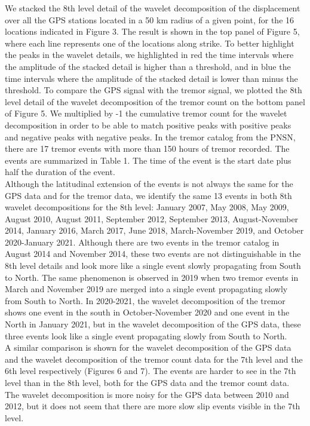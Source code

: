 \documentclass{article}
\begin{document}
We stacked the 8th level detail of the wavelet decomposition of the displacement over all the GPS stations located in a 50 km radius of a given point, for the 16 locations indicated in Figure 3. The result is shown in the top panel of Figure 5, where each line represents one of the locations along strike. To better highlight the peaks in the wavelet details, we highlighted in red the time intervals where the amplitude of the stacked detail is higher than a threshold, and in blue the  time intervals where the amplitude of the stacked detail is lower than minus the threshold. To compare the GPS signal with the tremor signal, we plotted the 8th level detail of the wavelet decomposition of the tremor count on the bottom panel of Figure 5. We multiplied by -1 the cumulative tremor count for the wavelet decomposition in order to be able to match positive peaks with positive peaks and negative peaks with negative peaks. In the tremor catalog from the PNSN, there are 17 tremor events with more than 150 hours of tremor recorded. The events are summarized in Table 1. The time of the event is the start date plus half the duration of the event. \\

Although the latitudinal extension of the events is not always the same for the GPS data and for the tremor data, we identify the same 13 events in both 8th wavelet decompositions for the 8th level: January 2007, May 2008, May 2009, August 2010, August 2011, September 2012, September 2013, August-November 2014, January 2016, March 2017, June 2018, March-November 2019, and October 2020-January 2021. Although there are two events in the tremor catalog in August 2014 and November 2014, these two events are not distinguishable in the 8th level details and look more like a single event slowly propagating from South to North. The same phenomenon is observed in 2019 when two tremor events in March and November 2019 are merged into a single event propagating slowly from South to North. In 2020-2021, the wavelet decomposition of the tremor shows one event in the south in October-November 2020 and one event in the North in January 2021, but in the wavelet decomposition of the GPS data, these three events look like a single event propagating slowly from South to North. \\

A similar comparison is shown for the wavelet decomposition of the GPS data and the wavelet decomposition of the tremor count data for the 7th level and the 6th level respectively (Figures 6 and 7). The events are harder to see in the 7th level than in the 8th level, both for the GPS data and the tremor count data. The wavelet decomposition is more noisy for the GPS data between 2010 and 2012, but it does not seem that there are more slow slip events visible in the 7th level. \\
\end{document}
